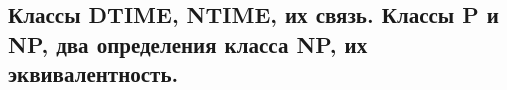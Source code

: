 \subsection{Классы DTIME, NTIME, их связь. Классы P и NP, два определения класса NP, их эквивалентность.}
